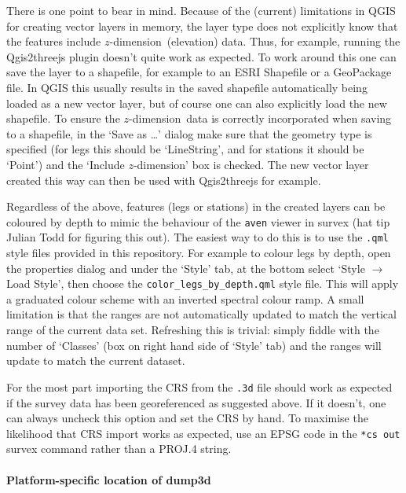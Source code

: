 \documentclass[]{article}
\let\oldparagraph\paragraph
\renewcommand{\paragraph}[1]{\oldparagraph{#1}\mbox{}}
\newcommand{\zdimension}{$z$-dimension}
\begin{document}
There is one point to bear in mind. Because of the (current) limitations
in QGIS for creating vector layers in memory, the layer type does not
explicitly know that the features include \zdimension\ (elevation) data.
Thus, for example, running the Qgis2threejs plugin doesn't quite work as
expected. To work around this one can save the layer to a shapefile, for
example to an ESRI Shapefile or a GeoPackage file. In QGIS this usually
results in the saved shapefile automatically being loaded as a new
vector layer, but of course one can also explicitly load the new shapefile.
To ensure the \zdimension\ data is correctly incorporated when saving to
a shapefile, in the `Save as \dots' dialog make sure that the
geometry type is specified (for legs this should be `LineString', and
for stations it should be `Point') and the `Include \zdimension' box is
checked. The new vector layer created this way can then be used with
Qgis2threejs for example.

Regardless of the above, features (legs or stations) in the created
layers can be coloured by depth to mimic the behaviour of the
\verb}aven} viewer in survex (hat tip Julian Todd for figuring this
out). The easiest way to do this is to use the \verb}.qml} style files
provided in this repository. For example to colour legs by depth, open
the properties dialog and under the `Style' tab, at the bottom select
`Style $\rightarrow$ Load Style', then choose the
\verb}color_legs_by_depth.qml} style file. This will apply a
graduated colour scheme with an inverted spectral colour ramp. A small
limitation is that the ranges are not automatically updated to match the
vertical range of the current data set. Refreshing this is trivial:
simply fiddle with the number of `Classes' (box on right hand side of
`Style' tab) and the ranges will update to match the current dataset.

For the most part importing the CRS from the \verb}.3d} file should
work as expected if the survey data has been georeferenced as suggested
above. If it doesn't, one can always uncheck this option and set the CRS
by hand. To maximise the likelihood that CRS import works as expected,
use an EPSG code in the \verb}*cs out} survex command rather than a
PROJ.4 string.

\paragraph{Platform-specific location of
dump3d}\label{platform-specific-location-of-dump3d}
\end{document}
